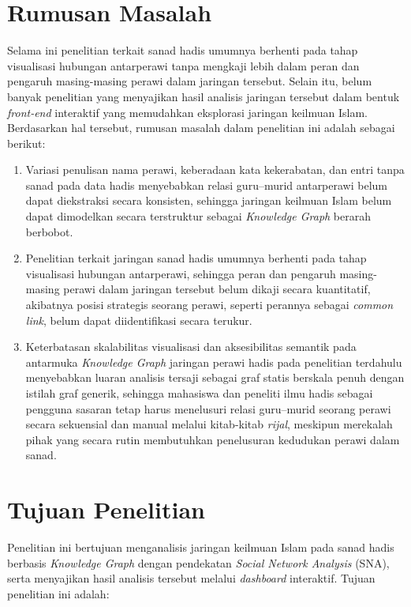 \section{Rumusan Masalah}

Selama ini penelitian terkait sanad hadis umumnya berhenti pada tahap visualisasi hubungan antarperawi tanpa mengkaji lebih dalam peran dan pengaruh masing-masing perawi dalam jaringan tersebut. Selain itu, belum banyak penelitian yang menyajikan hasil analisis jaringan tersebut dalam bentuk \textit{front-end} interaktif yang memudahkan eksplorasi jaringan keilmuan Islam. Berdasarkan hal tersebut, rumusan masalah dalam penelitian ini adalah sebagai berikut:


\begin{enumerate}
	\item Variasi penulisan nama perawi, keberadaan kata kekerabatan, dan entri tanpa sanad pada data hadis menyebabkan relasi guru--murid antarperawi belum dapat diekstraksi secara konsisten, sehingga jaringan keilmuan Islam belum dapat dimodelkan secara terstruktur sebagai \textit{Knowledge Graph} berarah berbobot.
	\item Penelitian terkait jaringan sanad hadis umumnya berhenti pada tahap visualisasi hubungan antarperawi, sehingga peran dan pengaruh masing-masing perawi dalam jaringan tersebut belum dikaji secara kuantitatif, akibatnya posisi strategis seorang perawi, seperti perannya sebagai \textit{common link}, belum dapat diidentifikasi secara terukur.
	\item Keterbatasan skalabilitas visualisasi dan aksesibilitas semantik pada antarmuka \textit{Knowledge Graph} jaringan perawi hadis pada penelitian terdahulu menyebabkan luaran analisis tersaji sebagai graf statis berskala penuh dengan istilah graf generik, sehingga mahasiswa dan peneliti ilmu hadis sebagai pengguna sasaran tetap harus menelusuri relasi guru--murid seorang perawi secara sekuensial dan manual melalui kitab-kitab \textit{rijal}, meskipun merekalah pihak yang secara rutin membutuhkan penelusuran kedudukan perawi dalam sanad.
\end{enumerate}

\section{Tujuan Penelitian}

Penelitian ini bertujuan menganalisis jaringan keilmuan Islam pada sanad hadis berbasis \textit{Knowledge Graph} dengan pendekatan \textit{Social Network Analysis} (SNA), serta menyajikan hasil analisis tersebut melalui \textit{dashboard} interaktif. Tujuan penelitian ini adalah:

